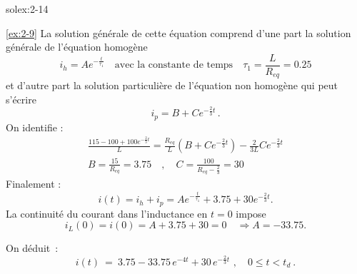 \begin{exwithsol}{solex:2-14}
\begin{solexercise}{\ref{ex:2-9}}
La solution g\'en\'erale de cette \'equation comprend d'une part la solution g\'en\'erale de l'\'equation homog\`ene
\[i_h=Ae^{-\frac{t}{\tau_1}}\quad \text{avec la constante de temps} \quad \tau_1=\frac{L}{R_{eq}}=0.25\]
et d'autre part la solution particuli\`ere de l'\'equation non homog\`ene qui peut s'\'ecrire
\[i_p=B+Ce^{-\frac{2}{3}t} \, .\]
On identifie :
\begin{align*}
\frac{115-100+100e^{-\frac{2}{3}t}}{L}=\frac{R_{eq}}{L}(B+Ce^{-\frac{2}{3}t})-\frac{2}{3L}Ce^{-\frac{2}{3}t}\\
B=\frac{15}{R_{eq}}=3.75  \quad , \quad C=\frac{100}{R_{eq}-\frac{2}{3}}=30
\end{align*}
Finalement :
\[i(t)=i_h+i_p=Ae^{-\frac{t}{\tau_1}}+3.75 +30e^{-\frac{2}{3}t}.\]
La continuit\'e du courant dans l'inductance en $t=0$ impose
\[i_L(0)=i(0)=A+3.75 +30=0 \quad \Rightarrow A=-33.75.\]


On d\'eduit~:
\[ i(t) \: = \: 3.75 - 33.75 \, e^{-4t} + 30 \, e^{-\frac{2}{3} t} \,\,
, \quad 0\leq t < t_d~.\]


\end{solexercise}
\end{exwithsol}

